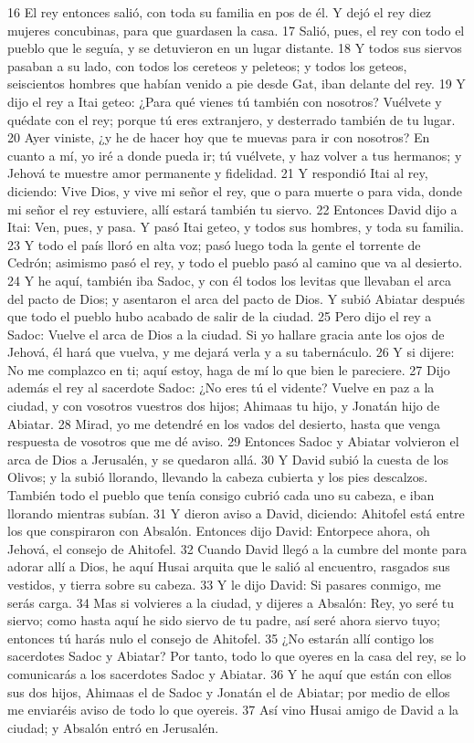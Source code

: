 16 El rey entonces salió, con toda su familia en pos de él. Y dejó el rey diez mujeres concubinas, para que guardasen la casa.
17 Salió, pues, el rey con todo el pueblo que le seguía, y se detuvieron en un lugar distante.
18 Y todos sus siervos pasaban a su lado, con todos los cereteos y peleteos; y todos los geteos, seiscientos hombres que habían venido a pie desde Gat, iban delante del rey.
19 Y dijo el rey a Itai geteo: ¿Para qué vienes tú también con nosotros? Vuélvete y quédate con el rey; porque tú eres extranjero, y desterrado también de tu lugar.
20 Ayer viniste, ¿y he de hacer hoy que te muevas para ir con nosotros? En cuanto a mí, yo iré a donde pueda ir; tú vuélvete, y haz volver a tus hermanos; y Jehová te muestre amor permanente y fidelidad.
21 Y respondió Itai al rey, diciendo: Vive Dios, y vive mi señor el rey, que o para muerte o para vida, donde mi señor el rey estuviere, allí estará también tu siervo.
22 Entonces David dijo a Itai: Ven, pues, y pasa. Y pasó Itai geteo, y todos sus hombres, y toda su familia.
23 Y todo el país lloró en alta voz; pasó luego toda la gente el torrente de Cedrón; asimismo pasó el rey, y todo el pueblo pasó al camino que va al desierto.
24 Y he aquí, también iba Sadoc, y con él todos los levitas que llevaban el arca del pacto de Dios; y asentaron el arca del pacto de Dios. Y subió Abiatar después que todo el pueblo hubo acabado de salir de la ciudad.
25 Pero dijo el rey a Sadoc: Vuelve el arca de Dios a la ciudad. Si yo hallare gracia ante los ojos de Jehová, él hará que vuelva, y me dejará verla y a su tabernáculo.
26 Y si dijere: No me complazco en ti; aquí estoy, haga de mí lo que bien le pareciere.
27 Dijo además el rey al sacerdote Sadoc: ¿No eres tú el vidente? Vuelve en paz a la ciudad, y con vosotros vuestros dos hijos; Ahimaas tu hijo, y Jonatán hijo de Abiatar.
28 Mirad, yo me detendré en los vados del desierto, hasta que venga respuesta de vosotros que me dé aviso.
29 Entonces Sadoc y Abiatar volvieron el arca de Dios a Jerusalén, y se quedaron allá.
30 Y David subió la cuesta de los Olivos; y la subió llorando, llevando la cabeza cubierta y los pies descalzos. También todo el pueblo que tenía consigo cubrió cada uno su cabeza, e iban llorando mientras subían.
31 Y dieron aviso a David, diciendo: Ahitofel está entre los que conspiraron con Absalón. Entonces dijo David: Entorpece ahora, oh Jehová, el consejo de Ahitofel.
32 Cuando David llegó a la cumbre del monte para adorar allí a Dios, he aquí Husai arquita que le salió al encuentro, rasgados sus vestidos, y tierra sobre su cabeza.
33 Y le dijo David: Si pasares conmigo, me serás carga.
34 Mas si volvieres a la ciudad, y dijeres a Absalón: Rey, yo seré tu siervo; como hasta aquí he sido siervo de tu padre, así seré ahora siervo tuyo; entonces tú harás nulo el consejo de Ahitofel. 
35 ¿No estarán allí contigo los sacerdotes Sadoc y Abiatar? Por tanto, todo lo que oyeres en la casa del rey, se lo comunicarás a los sacerdotes Sadoc y Abiatar.
36 Y he aquí que están con ellos sus dos hijos, Ahimaas el de Sadoc y Jonatán el de Abiatar; por medio de ellos me enviaréis aviso de todo lo que oyereis.
37 Así vino Husai amigo de David a la ciudad; y Absalón entró en Jerusalén.

